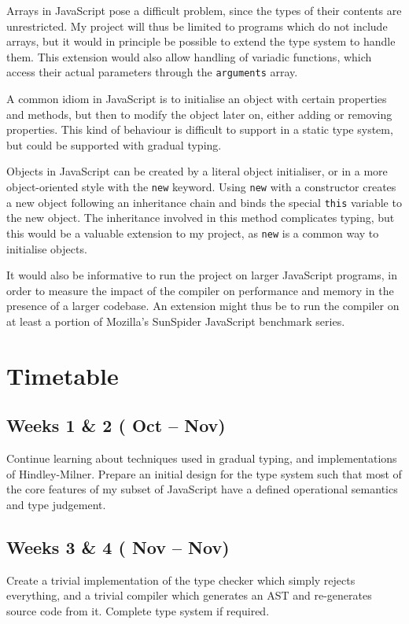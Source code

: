 \documentclass{article}
\begin{document}
		Arrays in JavaScript pose a difficult problem, since the types of their contents are unrestricted. My project will thus be limited to programs which do not include arrays, but it would in principle be possible to extend the type system to handle them. This extension would also allow handling of variadic functions, which access their actual parameters through the \texttt{arguments} array.

		A common idiom in JavaScript is to initialise an object with certain properties and methods, but then to modify the object later on, either adding or removing properties. This kind of behaviour is difficult to support in a static type system, but could be supported with gradual typing.

		Objects in JavaScript can be created by a literal object initialiser, or in a more object-oriented style with the \texttt{new} keyword. Using \texttt{new} with a constructor creates a new object following an inheritance chain and binds the special \texttt{this} variable to the new object. The inheritance involved in this method complicates typing, but this would be a valuable extension to my project, as \texttt{new} is a common way to initialise objects.

		It would also be informative to run the project on larger JavaScript programs, in order to measure the impact of the compiler on performance and memory in the presence of a larger codebase. An extension might thus be to run the compiler on at least a portion of Mozilla's SunSpider JavaScript benchmark series.

	\section{Timetable}\label{timetable}

		\subsection*{Weeks 1 \& 2 ( Oct --  Nov)}
		Continue learning about techniques used in gradual typing, and implementations of Hindley-Milner. Prepare an initial design for the type system such that most of the core features of my subset of  JavaScript have a defined operational semantics and type judgement.

		\subsection*{Weeks 3 \& 4 ( Nov --  Nov)}
		Create a trivial implementation of the type checker which simply rejects everything, and a trivial compiler which generates an AST and re-generates source code from it. Complete type system if required.
\end{document}
